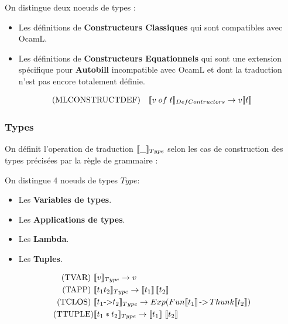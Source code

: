 \documentclass[12pt]{article}
\begin{document}
On distingue deux noeuds de types :
\begin{itemize}
      \tightlist
      \item
            Les définitions de \textbf{Constructeurs Classiques} qui sont compatibles avec OcamL.
      \item
            Les définitions de \textbf{Constructeurs Equationnels} qui sont une extension spécifique pour \textbf{Autobill} incompatible avec OcamL et dont la traduction n'est pas encore totalement définie.
\end{itemize}
\begin{align*}
      \text{(MLCONSTRUCTDEF)} \quad & \llbracket v \; of \; t \rrbracket_{DefContructors}   \rightarrow   v\llbracket t \rrbracket \\
\end{align*}

\subsubsection*{Types}\label{types-2}

On définit l'operation de traduction \(\llbracket \_ \rrbracket_{Type}\) selon les cas de construction
des types précisées par la règle de grammaire : 

On distingue 4 noeuds de types $Type$:
\begin{itemize}
      \tightlist
      \item
            Les \textbf{Variables de types}.
      \item
            Les \textbf{Applications de types}.
      \item
            Les \textbf{Lambda}.
      \item
            Les \textbf{Tuples}.
\end{itemize}
\begin{align*}
      \text{(TVAR) }  & \llbracket v \rrbracket_{Type} \rightarrow  v                                                                                          \\
      \text{(TAPP) }  & \llbracket t_1 t_2 \rrbracket_{Type} \rightarrow  \llbracket t_1 \rrbracket \, \llbracket t_2 \rrbracket                                       \\
      \text{(TCLOS) } & \llbracket t_1 \text{->} t_2 \rrbracket_{Type} \rightarrow  Exp (Fun\llbracket t_1 \rrbracket \, \text{->} \, Thunk\llbracket t_2 \rrbracket ) \\
      \text{(TTUPLE)} & \llbracket t_1 * t_2 \rrbracket_{Type} \rightarrow  \llbracket t_1 \rrbracket \,  \, \llbracket t_2 \rrbracket
\end{align*}
\end{document}
